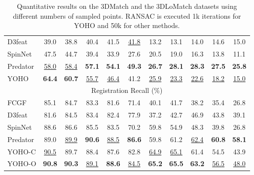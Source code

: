 \begin{table}[]
\begin{center}
{\begin{tabular}{lcccccccccc}
D3feat\cite{d3feat}      & 39.0          & 38.8          & 40.4          & 41.5          & \multicolumn{1}{c|}{\underline{41.8}}    & 13.2          & 13.1          & 14.0          & 14.6          & 15.0          \\
SpinNet\cite{ao2020spinnet}     & 47.5          & 44.7          & 39.4          & 33.9          & \multicolumn{1}{c|}{27.6}          & 20.5          & 19.0          & 16.3          & 13.8          & 11.1          \\
Predator\cite{predator}    & \underline{58.0}    & \underline{58.4}    & \textbf{57.1} & \textbf{54.1} & \multicolumn{1}{c|}{\textbf{49.3}} & \textbf{26.7} & \textbf{28.1} & \textbf{28.3} & \textbf{27.5} & \textbf{25.8} \\
YOHO      & \textbf{64.4} & \textbf{60.7} & \underline{55.7}    & \underline{46.4}    & \multicolumn{1}{c|}{41.2}          & \underline{25.9}    & \underline{23.3}    & \underline{22.6}    & \underline{18.2}    & \underline{15.0}    \\ \hline
\multicolumn{11}{c}{Registration Recall (\%)}                                                                                                                                                  \\ \hline
FCGF\cite{FCGF}        & 85.1          & 84.7          & 83.3          & 81.6          & \multicolumn{1}{c|}{71.4}          & 40.1          & 41.7          & 38.2          & 35.4          & 26.8          \\
D3feat\cite{d3feat}      & 81.6          & 84.5          & 83.4          & 82.4          & \multicolumn{1}{c|}{77.9}          & 37.2          & 42.7          & 46.9          & 43.8          & 39.1          \\
SpinNet\cite{ao2020spinnet}     & 88.6          & 86.6          & 85.5          & 83.5          & \multicolumn{1}{c|}{70.2}          & 59.8          & 54.9          & 48.3          & 39.8          & 26.8          \\
Predator\cite{predator}    & 89.0            & \underline{89.9}          & \textbf{90.6} & \underline{88.5} & \multicolumn{1}{c|}{\textbf{86.6}} & 59.8          & 61.2          & \underline{62.4}          & \textbf{60.8} & \textbf{58.1} \\
YOHO-C    & \underline{90.5}    & 89.7    & 88.4    & 87.6    & \multicolumn{1}{c|}{82.8}          & \underline{64.9}    & \underline{65.1}    & 61.4    & 54.5          & 43.9          \\
YOHO-O    & \textbf{90.8} & \textbf{90.3} & \underline{89.1}          & \textbf{88.6}          & \multicolumn{1}{c|}{\underline{84.5}}    & \textbf{65.2} & \textbf{65.5} & \textbf{63.2} & \underline{56.5}    & \underline{48.0}      \\ 
\bottomrule[1.5pt]
\end{tabular}}
\end{center}
\caption{Quantitative results on the 3DMatch and the 3DLoMatch datasets using different numbers of sampled points. RANSAC is executed 1k iterations for YOHO and 50k for other methods.}
\label{tab:sample}
\vspace{-20pt}
\end{table}
